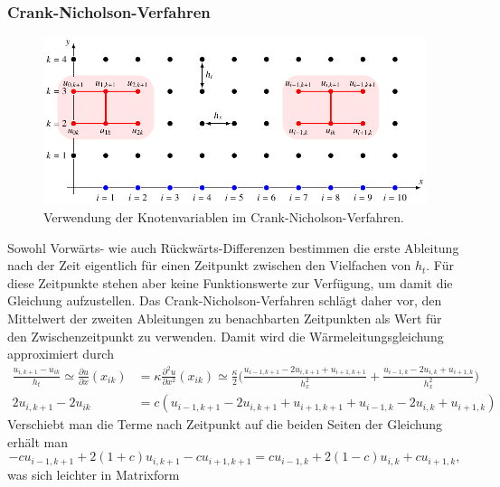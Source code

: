 \subsubsection{Crank-Nicholson-Verfahren}
\begin{figure}
\centering
\includegraphics{chapters/70-pde/images/cngrid.pdf}
\caption{Verwendung der Knotenvariablen im Crank-Nicholson-Verfahren.
\label{buch:pde:figure:cngrid}}
\end{figure}
Sowohl Vorwärts- wie auch Rückwärts-Differenzen bestimmen die erste
Ableitung nach der Zeit eigentlich für einen Zeitpunkt zwischen 
den Vielfachen von $h_t$.
Für diese Zeitpunkte stehen aber keine Funktionswerte zur Verfügung, 
um damit die Gleichung aufzustellen.
Das Crank-Nicholson-Verfahren schlägt daher vor, den Mittelwert der
zweiten Ableitungen zu benachbarten Zeitpunkten als Wert für den
Zwischenzeitpunkt zu verwenden.
Damit wird die Wärmeleitungsgleichung approximiert durch
\begin{align*}
\frac{u_{i,k+1}-u_{ik}}{h_t}
\simeq
\frac{\partial u}{\partial x}(x_{ik})
&=
\kappa
\frac{\partial^2 u}{\partial x^2}(x_{ik})
\simeq
\frac{\kappa}2\biggl(
\frac{u_{i-1,k+1}-2u_{i,k+1}+u_{i+1,k+1}}{h_x^2}
+
\frac{u_{i-1,k}-2u_{i,k}+u_{i+1,k}}{h_x^2}
\biggr)
\\
2u_{i,k+1}-2u_{ik}
&=
c(
u_{i-1,k+1}-2u_{i,k+1}+u_{i+1,k+1}
+
u_{i-1,k}-2u_{i,k}+u_{i+1,k}
)
\end{align*}
Verschiebt man die Terme nach Zeitpunkt auf die beiden Seiten
der Gleichung erhält man
\begin{equation}
-cu_{i-1,k+1}+2(1+c)u_{i,k+1}-cu_{i+1,k+1}
=
cu_{i-1,k}+2(1-c)u_{i,k}+cu_{i+1,k},
\end{equation}
was sich leichter in Matrixform 
